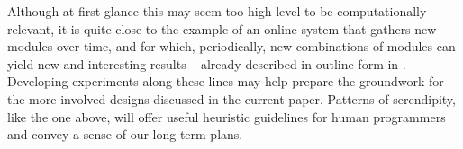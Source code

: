 \bigskip

Although at first glance this may seem too high-level to be
computationally relevant, it is quite close to the example of an
online system that gathers new modules over time, and for which,
periodically, new combinations of modules can yield new and
interesting results -- already described in outline form in
\cite{pease2013discussion}.  
%
Developing experiments along these lines may help prepare the
groundwork for the more involved designs discussed in the current
paper.
%
Patterns of serendipity, like the one above, will offer useful
heuristic guidelines for human programmers
and convey a sense of our long-term plans.

